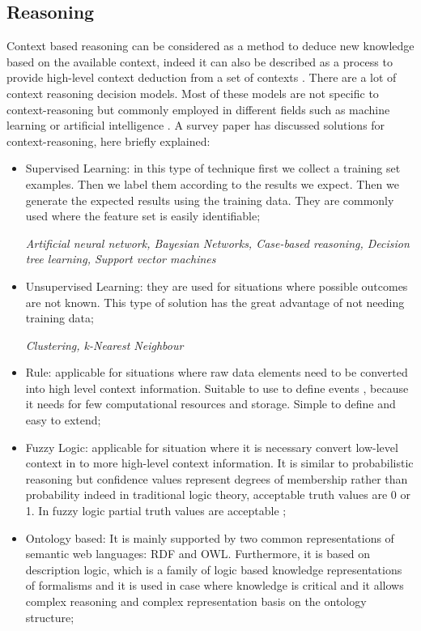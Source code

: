 \documentclass{thesisreport}
\begin{document}
 \subsection{Reasoning}
 Context based reasoning can be considered as a method to deduce new knowledge based on the available context, indeed it can also be described as a process to provide high-level context deduction from a set of contexts \cite{perera2014context}.
 There are a lot of context reasoning decision models. Most of these models are not specific to context-reasoning but commonly employed in different fields such as machine learning or artificial intelligence \cite{perera2014context}.
 A survey paper \cite{perera2014context} has discussed solutions for context-reasoning, here briefly explained: 
 \begin{itemize}
     \item Supervised Learning: in this type of technique first we collect a training set examples. Then we label them according to the results we expect. Then we generate the expected results using the training data.
     They are commonly used where the feature set is easily identifiable;
     
     \textit{Artificial neural network, Bayesian Networks, Case-based reasoning, Decision tree learning, Support vector machines}
     \item Unsupervised Learning: they are used for situations where possible outcomes are not known. This type of solution has the great advantage of not needing training data;
     
     \textit{Clustering, k-Nearest Neighbour}
     \item Rule: applicable for situations where raw data elements need to be converted into high level context information. Suitable to use to define events , because it needs for few computational resources and storage. Simple to define and easy to extend; 
     \item Fuzzy Logic: applicable for situation where it is necessary convert low-level context in to more high-level context information. It is similar to probabilistic reasoning but confidence values represent degrees of membership rather than probability indeed in traditional logic theory, acceptable truth values are 0 or 1. In fuzzy logic partial truth values are acceptable \cite{perera2014context}; 
     \item Ontology based: It is mainly supported by two common representations of semantic web languages: RDF and OWL. Furthermore, it is based on description logic, which is a family of logic based knowledge representations of formalisms and it is used in case where knowledge is critical and it allows complex reasoning and complex representation basis on the ontology structure;
    

\end{itemize}
\end{document}
